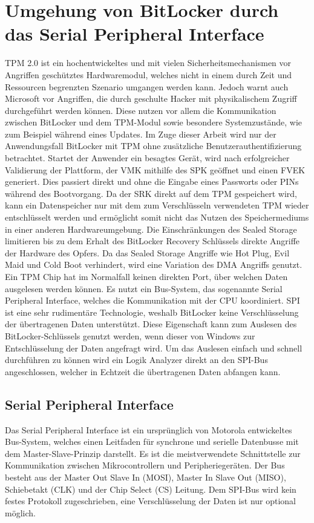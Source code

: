 \documentclass[conference]{IEEEtran}
\begin{document}
\section{Umgehung von BitLocker durch das Serial Peripheral Interface}
TPM 2.0 ist ein hochentwickeltes und mit vielen Sicherheitsmechanismen vor Angriffen geschütztes Hardwaremodul, welches nicht in einem durch Zeit und Ressourcen begrenzten Szenario umgangen werden kann. Jedoch warnt auch Microsoft vor Angriffen, die durch geschulte Hacker mit physikalischem Zugriff durchgeführt werden können. \cite{Dansimp.13122021} Diese nutzen vor allem die Kommunikation zwischen BitLocker und dem TPM-Modul sowie besondere Systemzustände, wie zum Beispiel während eines Updates. \cite{Turpe.2009} Im Zuge dieser Arbeit wird nur der Anwendungsfall BitLocker mit TPM  ohne zusätzliche Benutzerauthentifizierung betrachtet. Startet der Anwender ein besagtes Gerät, wird nach erfolgreicher Validierung der Plattform, der VMK mithilfe des SPK geöffnet und einen FVEK generiert. Dies passiert direkt und ohne die Eingabe eines Passworts oder PINs während des Bootvorgang. Da der SRK direkt auf dem TPM gespeichert wird, kann ein Datenspeicher nur mit dem zum Verschlüsseln verwendeten TPM wieder entschlüsselt werden und ermöglicht somit nicht das Nutzen des Speichermediums in einer anderen Hardwareumgebung. Die Einschränkungen des Sealed Storage limitieren bis zu dem Erhalt des BitLocker Recovery Schlüssels direkte Angriffe der Hardware des Opfers. Da das Sealed Storage Angriffe wie Hot Plug, Evil Maid und Cold Boot verhindert, wird eine Variation des DMA Angriffs genutzt. Ein TPM Chip hat im Normalfall keinen direkten Port, über welchen Daten ausgelesen werden können. Es nutzt ein Bus-System, das sogenannte Serial Peripheral Interface, welches die Kommunikation mit der CPU koordiniert. SPI ist eine sehr rudimentäre Technologie, weshalb BitLocker keine Verschlüsselung der übertragenen Daten unterstützt. Diese Eigenschaft kann zum Auslesen des BitLocker-Schlüssels genutzt werden, wenn dieser von Windows zur Entschlüsselung der Daten angefragt wird. Um das Auslesen einfach und schnell durchführen zu können wird ein Logik Analyzer direkt an den SPI-Bus angeschlossen, welcher in Echtzeit die übertragenen Daten abfangen kann. \cite{FSecureLabs.03122021} \cite{Winter.2013}

\subsection{Serial Peripheral Interface}
Das Serial Peripheral Interface ist ein ursprünglich von Motorola entwickeltes Bus-System, welches einen Leitfaden für synchrone und serielle Datenbusse mit dem Master-Slave-Prinzip darstellt. Es ist die meistverwendete Schnittstelle zur Kommunikation zwischen Mikrocontrollern und Peripheriegeräten. Der Bus besteht aus der Master Out Slave In (MOSI), Master In Slave Out (MISO), Schiebetakt (CLK) und der Chip Select (CS) Leitung. Dem SPI-Bus wird kein festes Protokoll zugeschrieben, eine Verschlüsselung der Daten ist nur optional möglich. \cite[S. 335-349]{Wootton.2016}
\end{document}
